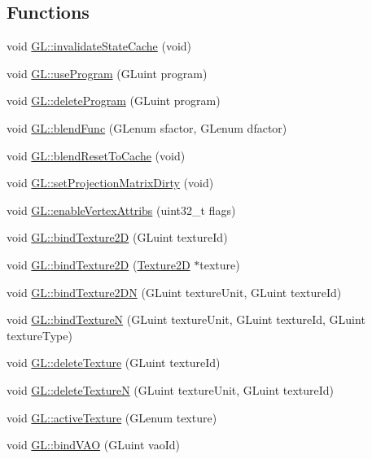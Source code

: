 \subsection*{Functions}
\begin{DoxyCompactItemize}
\item 
void \hyperlink{group__renderer_gacde276633720dd2a8d95ae216caea11a}{G\+L\+::invalidate\+State\+Cache} (void)
\item 
void \hyperlink{group__renderer_ga9a278fd0f2e0e04afd32de3995fcf791}{G\+L\+::use\+Program} (G\+Luint program)
\item 
void \hyperlink{group__renderer_gaad6e1d3b388bf7c8825b304bf2baf14a}{G\+L\+::delete\+Program} (G\+Luint program)
\item 
void \hyperlink{group__renderer_ga9ecd3206eccd7de4f79d000a5ba7cb0c}{G\+L\+::blend\+Func} (G\+Lenum sfactor, G\+Lenum dfactor)
\item 
void \hyperlink{group__renderer_gab8d542e76939f243e7da00a8abb9a08c}{G\+L\+::blend\+Reset\+To\+Cache} (void)
\item 
void \hyperlink{group__renderer_ga76bea3d67ff1576fa108c8fc32a4e34d}{G\+L\+::set\+Projection\+Matrix\+Dirty} (void)
\item 
void \hyperlink{group__renderer_ga84757e12b5ee56e6e57ab3f4785c8c16}{G\+L\+::enable\+Vertex\+Attribs} (uint32\+\_\+t flags)
\item 
void \hyperlink{group__renderer_ga9cb186f49883ba35d09424da1797736f}{G\+L\+::bind\+Texture2D} (G\+Luint texture\+Id)
\item 
void \hyperlink{group__renderer_gaf0a8334fdbf6291ae3fac1ac005d60b7}{G\+L\+::bind\+Texture2D} (\hyperlink{classTexture2D}{Texture2D} $\ast$texture)
\item 
void \hyperlink{group__renderer_gac77f4d272961392154fad22ab2801797}{G\+L\+::bind\+Texture2\+DN} (G\+Luint texture\+Unit, G\+Luint texture\+Id)
\item 
void \hyperlink{group__renderer_gac29040816c18820a701304e30ec5d88b}{G\+L\+::bind\+TextureN} (G\+Luint texture\+Unit, G\+Luint texture\+Id, G\+Luint texture\+Type)
\item 
void \hyperlink{group__renderer_gade1503e565e17f126d7b9e134c203fda}{G\+L\+::delete\+Texture} (G\+Luint texture\+Id)
\item 
void \hyperlink{group__renderer_ga37672bf0ea82a58b76da9aaf2e1708b8}{G\+L\+::delete\+TextureN} (G\+Luint texture\+Unit, G\+Luint texture\+Id)
\item 
void \hyperlink{group__renderer_ga2a75af9e657f32a5d6832a419118d449}{G\+L\+::active\+Texture} (G\+Lenum texture)
\item 
void \hyperlink{group__renderer_gafecfbac8accd7b77a5367e8555bbaec4}{G\+L\+::bind\+V\+AO} (G\+Luint vao\+Id)
\end{DoxyCompactItemize}


